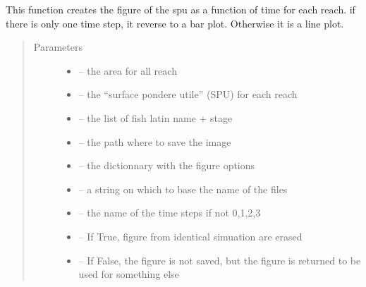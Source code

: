 \documentclass[letterpaper,10pt,english]{sphinxmanual}
\begin{document}
\begin{fulllineitems}
\label{\detokenize{index:src.calcul_hab.save_hab_fig_spu}}
This function creates the figure of the spu as a function of time for each reach. if there is only one
time step, it reverse to a bar plot. Otherwise it is a line plot.
\begin{quote}\begin{description}
\item[{Parameters}] \leavevmode\begin{itemize}
\item {} 
 -- the area for all reach

\item {} 
 -- the ``surface pondere utile'' (SPU) for each reach

\item {} 
 -- the list of fish latin name + stage

\item {} 
 -- the path where to save the image

\item {} 
 -- the dictionnary with the figure options

\item {} 
 -- a string on which to base the name of the files

\item {} 
 -- the name of the time steps if not 0,1,2,3

\item {} 
 -- If True, figure from identical simuation are erased

\item {} 
 -- If False, the figure is not saved, but the figure is returned to be used for something else

\end{itemize}

\end{description}\end{quote}

\end{fulllineitems}
\end{document}
